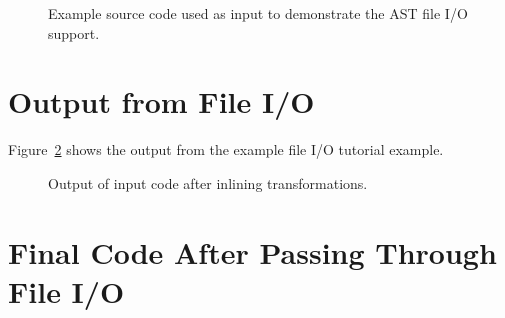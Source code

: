 \begin{figure}[!h]
{\indent
{\mySmallFontSize

\begin{latexonly}
   
\end{latexonly}

\begin{htmlonly}
   
\end{htmlonly}

}
}
\caption{Example source code used as input to demonstrate the AST file I/O support.}
\label{Tutorial:exampleInputCode_astFileIO}
\end{figure}



\section{Output from File I/O}

   Figure~\ref{Tutorial:exampleOutput_astFileIO} 
shows the output from the example file I/O tutorial example.

\begin{figure}[!h]
{\indent
{\mySmallFontSize

\begin{latexonly}
   
\end{latexonly}

\begin{htmlonly}
   
\end{htmlonly}

}
}
\caption{Output of input code after inlining transformations.}
\label{Tutorial:exampleOutput_astFileIO}
\end{figure}

\section{Final Code After Passing Through File I/O}

